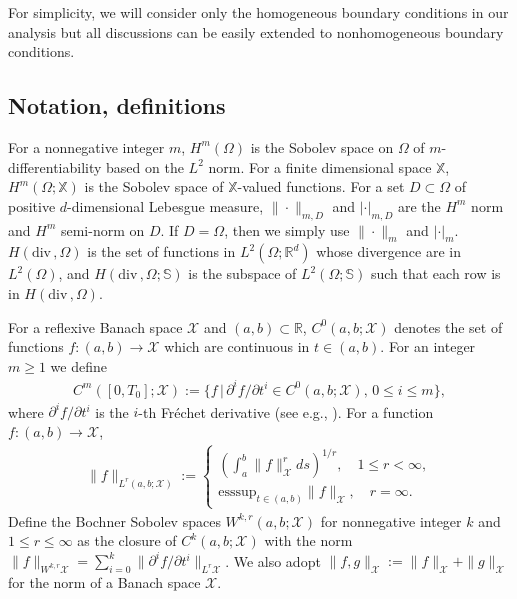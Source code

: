 \documentclass[10pt,letterpaper]{amsart}
\theoremstyle{plain} %
\theoremstyle{remark} %
\newcommand{\divergence}{\mathrm{div}\,}
\newcommand{\R}{\mathbb{R}} %
\newcommand{\Rsym}{\mathbb{S}} %
\begin{document}
For simplicity, we will consider only the homogeneous boundary conditions in our analysis but all discussions can be easily extended to nonhomogeneous boundary conditions.

\subsection{Notation, definitions}

For a nonnegative integer $m$, $H^m (\Omega)$ is the Sobolev space on $\Omega$ of $m$-differentiability based on the $L^2$ norm. For a finite dimensional space $\mathbb{X}$, $H^m(\Omega; \mathbb{X})$ is the Sobolev space of $\mathbb{X}$-valued functions. 
For a set $D \subset \Omega$ of positive $d$-dimensional Lebesgue measure, $\| \cdot \|_{m,D}$ and $|\cdot|_{m,D}$ are the $H^m$ norm and $H^m$ semi-norm on $D$. If $D = \Omega$, then we simply use $\| \cdot \|_m$ and $|\cdot|_m$. $H(\divergence, \Omega)$ is the set of functions in $L^2(\Omega; \R^d)$ whose divergence are in $L^2(\Omega)$, and $H(\divergence,\Omega; \Rsym)$ is the subspace of $L^2(\Omega; \Rsym)$ such that each row is in $H(\divergence, \Omega)$. 


For a reflexive Banach space $\mathcal{X}$ and $(a, b) \subset \R$, $C^0 (a, b; \mathcal{X})$ denotes the set of functions $f : (a,b) \rightarrow \mathcal{X}$ which are continuous in $t \in (a,b)$. For an integer $m \geq 1$ we define 
%
\begin{align*}
	C^m ([0,T_0]; \mathcal{X}) := \{ f \, | \, \partial^{i}f/\partial t^{i} \in C^0(a,b;\mathcal{X}), \, 0 \leq i \leq m \},
\end{align*}
%
where $\partial^i f/\partial t^i$ is the $i$-th Fr\'echet derivative (see e.g., \cite{Yosida-book}). For a function $f : (a,b) \to  \mathcal{X}$, 
%
\begin{align*}
	\| f \|_{L^r(a,b; \mathcal{X})} := 
	\begin{cases}
		\left( \int_a^b \| f \|_\mathcal{X}^r ds \right)^{1/r}, \quad 1 \leq r < \infty, \\
		\text{esssup}_{t \in (a,b)} \| f \|_\mathcal{X}, \quad r = \infty.
	\end{cases}
\end{align*}
%
Define the Bochner Sobolev spaces $W^{k,r}(a, b; \mathcal{X})$ for nonnegative integer $k$ and $1 \leq r \leq \infty$ as the closure of $C^k (a,b; \mathcal{X})$ with the norm $\| f \|_{W^{k,r} \mathcal{X}} = \sum_{i=0}^k \| \partial^i f / \partial t^i \|_{L^r \mathcal{X}}$. 
We also adopt $\| f, g \|_\mathcal{X} := \| f \|_\mathcal{X} + \| g \|_\mathcal{X}$ for the norm of a Banach space $\mathcal{X}$. 
\end{document}
